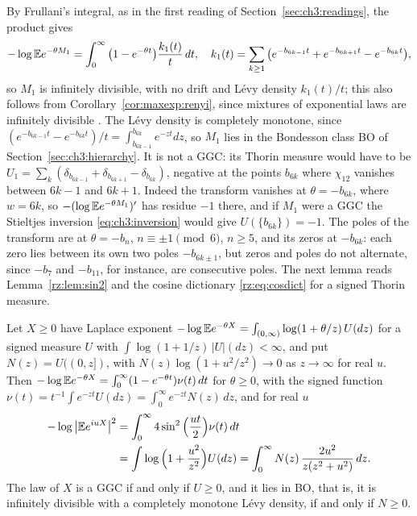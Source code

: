 By Frullani's integral, as in the first reading of Section~\ref{sec:ch3:readings}, the product gives
\[
-\log\mathbb{E} e^{-\theta M_1}=\int_0^\infty\big(1-e^{-\theta t}\big)\frac{k_1(t)}t\,dt,\quad k_1(t)=\sum_{k\ge1}\big(e^{-b_{6k-1}t}+e^{-b_{6k+1}t}-e^{-b_{6k}t}\big),
\]
so $M_1$ is infinitely divisible, with no drift and L\'evy density $k_1(t)/t$; this also follows from Corollary~\ref{cor:maxexp:renyi}, since mixtures of exponential laws are infinitely divisible \cite{Goldie67,Steutel67}. The L\'evy density is completely monotone, since $(e^{-b_{6k-1}t}-e^{-b_{6k}t})/t=\int_{b_{6k-1}}^{b_{6k}}e^{-zt}dz$, so $M_1$ lies in the Bondesson class BO of Section~\ref{sec:ch3:hierarchy}. It is not a GGC: its Thorin measure would have to be $U_1=\sum_k(\delta_{b_{6k-1}}+\delta_{b_{6k+1}}-\delta_{b_{6k}})$, negative at the points $b_{6k}$ where $\chi_{12}$ vanishes between $6k-1$ and $6k+1$. Indeed the transform vanishes at $\theta=-b_{6k}$, where $w=6k$, so $-(\log\mathbb{E} e^{-\theta M_1})'$ has residue $-1$ there, and if $M_1$ were a GGC the Stieltjes inversion \eqref{eq:ch3:inversion} would give $U(\{b_{6k}\})=-1$. The poles of the transform are at $\theta=-b_n$, $n\equiv\pm1\pmod6$, $n\ge5$, and its zeros at $-b_{6k}$: each zero lies between its own two poles $-b_{6k\pm1}$, but zeros and poles do not alternate, since $-b_7$ and $-b_{11}$, for instance, are consecutive poles. The next lemma reads Lemma~\ref{rz:lem:sin2} and the cosine dictionary \eqref{rz:eq:cosdict} for a signed Thorin measure.

\begin{lemma}\label{lem:maxexp:dict}
Let $X\ge0$ have Laplace exponent $-\log\mathbb{E} e^{-\theta X}=\int_{(0,\infty)}\log(1+\theta/z)\,U(dz)$ for a signed measure $U$ with $\int\log(1+1/z)\,|U|(dz)<\infty$, and put $N(z)=U((0,z])$, with $N(z)\log(1+u^2/z^2)\to0$ as $z\to\infty$ for real $u$. Then $-\log\mathbb{E} e^{-\theta X}=\int_0^\infty(1-e^{-\theta t})\nu(t)\,dt$ for $\theta\ge0$, with the signed function $\nu(t)=t^{-1}\int e^{-zt}U(dz)=\int_0^\infty e^{-zt}N(z)\,dz$, and for real $u$
\begin{equation}\label{eq:maxexp:three}
\begin{aligned}
-\log\big|\mathbb{E} e^{iuX}\big|^2&=\int_0^\infty4\sin^2\Big(\frac{ut}2\Big)\nu(t)\,dt\\
&=\int\log\Big(1+\frac{u^2}{z^2}\Big)U(dz)=\int_0^\infty N(z)\,\frac{2u^2}{z(z^2+u^2)}\,dz .
\end{aligned}
\end{equation}
The law of $X$ is a GGC if and only if $U\ge0$, and it lies in BO, that is, it is infinitely divisible with a completely monotone L\'evy density, if and only if $N\ge0$.
\end{lemma}

